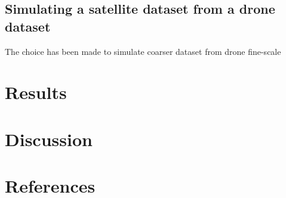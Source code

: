 \documentclass[
  letterpaper,
  DIV=11,
  numbers=noendperiod]{scrartcl}
\begin{document}
\subsection{Simulating a satellite dataset from a drone
dataset}\label{simulating-a-satellite-dataset-from-a-drone-dataset}

The choice has been made to simulate coarser dataset from drone
fine-scale

\section{Results}\label{results}

\section{Discussion}\label{discussion}

\section*{References}\label{references}
\end{document}
